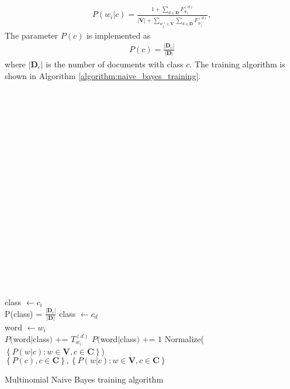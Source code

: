 \begin{align}
P(w_i\vert c) =
\frac
	{
		1 + \sum_{d \in \mathbf{D}} F_{w_i}^{(d)}
	}
	{
		\left\vert\mathbf{V}\right\vert + \sum_{w_j' \in \mathbf{V}} \sum_{d \in \mathbf{D}} F_{w_j'}^{(d)}
	},
\end{align}
The parameter $P(c)$ is implemented as
\begin{align}
P(c) = \frac{\left\vert\mathbf{D}_c\right\vert}{\left\vert\mathbf{D}\right\vert}
\end{align}
where $\left\vert\mathbf{D}_c\right\vert$ is the number of documents with class $c$. The training algorithm is shown in Algorithm \ref{algorithm:naive_bayes_training}.\\\\\\\\\\\\\\\\\\\\\\\\\\\\\\\\\\\\\\

\begin{algorithm}[h]
 \SetAlgoLined
 
  {
  	class $\leftarrow c_i$\\
  	P(class) = $\frac{\left\vert\mathbf{D}_c\right\vert}{\left\vert\mathbf{D}\right\vert}$
  }
 {
	class $\leftarrow c_d$\\
	{
		word $\leftarrow w_i$ \\
		{
			$P($word$\vert$class$)$ += $T_{w_i}^{(d)}$
		}
		\Else
		{
			$P($word$\vert$class$)$ += $1$
		}
	}
 }
 Normalize($\left\{P(w\vert c) : w \in \mathbf{V}, c \in \mathbf{C}\right\}$)\\
 \Return $\left\{P(c), c \in \mathbf{C}\right\}, \left\{P(w\vert c) : w \in \mathbf{V}, c \in \mathbf{C}\right\}$
 \caption{Multinomial Naive Bayes training algorithm}
 \label{algorithm:naive_bayes_training}
\end{algorithm}
